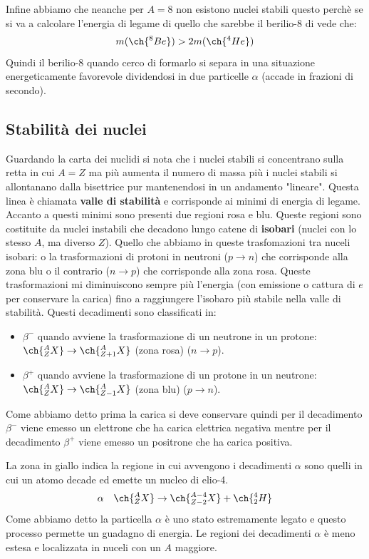 Infine abbiamo che neanche per $A=8$ non esistono nuclei stabili questo perchè se si va a calcolare l'energia di legame di quello che sarebbe il berilio-8 di vede che:
\begin{equation*}
    m(\ch{^8Be})>2m(\ch{^4He})
\end{equation*}
Quindi il berilio-8 quando cerco di formarlo si separa in una situazione energeticamente favorevole dividendosi in due particelle $\alpha$ (accade in frazioni di secondo).
\subsection{Stabilità dei nuclei}
Guardando la carta dei nuclidi si nota che i nuclei stabili si concentrano sulla retta in cui $A=Z$ ma più aumenta il numero di massa più i nuclei stabili si allontanano dalla bisettrice pur mantenendosi in un andamento "lineare". Questa linea è chiamata \textbf{valle di stabilità} e corrisponde ai minimi di energia di legame. Accanto a questi minimi sono presenti due regioni rosa e blu. Queste regioni sono costituite da nuclei instabili che decadono lungo catene di \textbf{isobari} (nuclei con lo stesso $A$, ma diverso $Z$). Quello che abbiamo in queste trasfomazioni tra nuceli isobari: o la trasformazioni di protoni in neutroni ($p\to n$) che corrisponde alla zona blu o il contrario ($n\to p$) che corrisponde alla zona rosa. Queste trasformazioni mi diminuiscono sempre più l'energia (con emissione o cattura di $e$ per conservare la carica) fino a raggiungere l'isobaro più stabile nella valle di stabilità. Questi decadimenti sono classificati in:
\begin{itemize}
    \item $\beta^-$ quando avviene la trasformazione di un neutrone in un protone: $\ch{^A_Z X}\to\ch{^A_{Z+1} X}$ (zona rosa) ($n\to p$).
    \item $\beta^+$ quando avviene la trasformazione di un protone in un neutrone: $\ch{^A_Z X}\to\ch{^A_{Z-1} X}$ (zona blu) ($p\to n$).
\end{itemize}
Come abbiamo detto prima la carica si deve conservare quindi per il decadimento $\beta^-$ viene emesso un elettrone che ha carica elettrica negativa mentre per il decadimento $\beta^+$ viene emesso un positrone che ha carica positiva.

La zona in giallo indica la regione in cui avvengono i decadimenti $\alpha$ sono quelli in cui un atomo decade ed emette un nucleo di elio-4.
\begin{equation*}
    \alpha \quad \ch{^A_Z X}\to\ch{^{A-4}_{Z-2} X}+\ch{^4_2 H}
\end{equation*}
Come abbiamo detto la particella $\alpha$ è uno stato estremamente legato e questo processo permette un guadagno di energia. Le regioni dei decadimenti $\alpha$ è meno estesa e localizzata in nuceli con un $A$ maggiore. 

